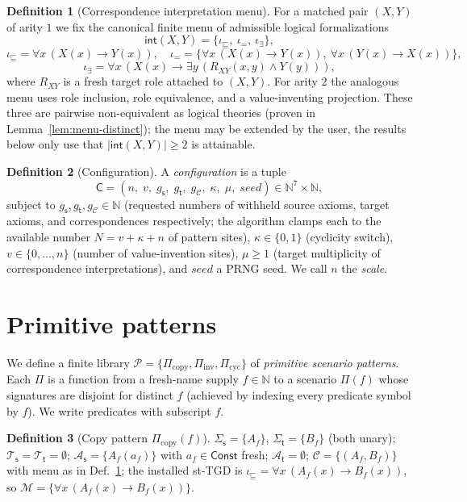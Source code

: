 \documentclass{amsart}
\theoremstyle{definition}
\newtheorem{definition}{Definition}
\newcommand{\Tbox}{\mathcal{T}}
\newcommand{\Abox}{\mathcal{A}}
\newcommand{\Sig}{\Sigma}
\newcommand{\Map}{\mathcal{M}}
\newcommand{\src}{\mathsf{s}}
\newcommand{\trg}{\mathsf{t}}
\newcommand{\Cfg}{\mathsf{C}}
\newcommand{\Cor}{\mathcal{C}}
\newcommand{\Nat}{\mathbb{N}}
\begin{document}
\begin{definition}[Correspondence interpretation menu]\label{def:correspondence-menu}
For a matched pair $(X,Y)$ of arity $1$ we fix the canonical finite menu of
admissible logical formalizations
\[
\mathsf{int}(X,Y)=\{\iota_{\sqsubseteq},\ \iota_{=},\ \iota_{\exists}\},
\]
\[
\iota_{\sqsubseteq}=\forall x\,(X(x)\to Y(x)),\quad
\iota_{=}=\{\forall x\,(X(x)\to Y(x)),\ \forall x\,(Y(x)\to X(x))\},
\]
\[
\iota_{\exists}=\forall x\,(X(x)\to\exists y\,(R_{XY}(x,y)\wedge Y(y))),
\]
where $R_{XY}$ is a fresh target role attached to $(X,Y)$. For arity $2$ the
analogous menu uses role inclusion, role equivalence, and a value-inventing
projection. These three are pairwise non-equivalent as logical theories (proven
in Lemma~\ref{lem:menu-distinct}); the menu may be extended by the user, the
results below only use that $|\mathsf{int}(X,Y)|\ge 2$ is attainable.
\end{definition}

\begin{definition}[Configuration]\label{def:config}
A \emph{configuration} is a tuple
\[
\Cfg=(n,\;v,\;g_\src,\;g_\trg,\;g_\Cor,\;\kappa,\;\mu,\;\mathit{seed})\in\Nat^{7}\times\Nat,
\]
subject to $g_\src,g_\trg,g_\Cor\in\Nat$ (requested numbers of withheld source
axioms, target axioms, and correspondences respectively; the algorithm clamps
each to the available number $N=v+\kappa+n$ of pattern sites), $\kappa\in\{0,1\}$
(cyclicity switch), $v\in\{0,\dots,n\}$ (number of value-invention sites),
$\mu\ge 1$ (target multiplicity of correspondence interpretations), and
$\mathit{seed}$ a PRNG seed. We call $n$ the \emph{scale}.
\end{definition}

\section{Primitive patterns}\label{sec:patterns}

We define a finite library $\mathcal{P}=\{\Pi_{\mathrm{copy}},
\Pi_{\mathrm{inv}}, \Pi_{\mathrm{cyc}}\}$ of \emph{primitive scenario patterns}.
Each $\Pi$ is a function from a fresh-name supply $f\in\Nat$ to a scenario
$\Pi(f)$ whose signatures are disjoint for distinct $f$ (achieved by indexing
every predicate symbol by $f$). We write predicates with subscript $f$.

\begin{definition}[Copy pattern $\Pi_{\mathrm{copy}}(f)$]\label{def:copy}
$\Sig_\src=\{A_f\}$, $\Sig_\trg=\{B_f\}$ (both unary);
$\Tbox_\src=\Tbox_\trg=\emptyset$;
$\Abox_\src=\{A_f(a_f)\}$ with $a_f\in\mathsf{Const}$ fresh;
$\Abox_\trg=\emptyset$; $\Cor=\{(A_f,B_f)\}$ with menu as in
Def.~\ref{def:correspondence-menu}; the installed st-TGD is
$\iota_{\sqsubseteq}=\forall x\,(A_f(x)\to B_f(x))$, so
$\Map=\{\forall x\,(A_f(x)\to B_f(x))\}$.
\end{definition}
\end{document}
